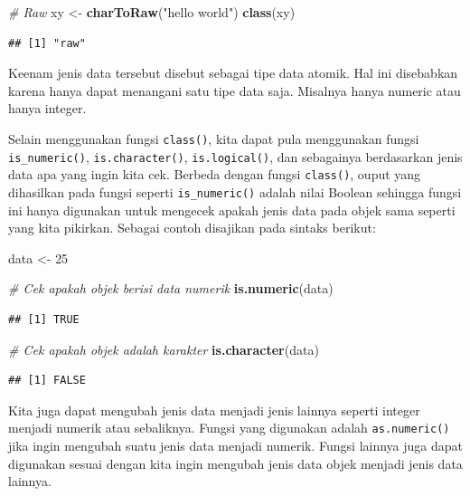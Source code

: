 \documentclass[]{book}
\newenvironment{Shaded}{\begin{snugshade}}{\end{snugshade}}
\newcommand{\CommentTok}[1]{\textcolor[rgb]{0.56,0.35,0.01}{\textit{#1}}}
\newcommand{\DecValTok}[1]{\textcolor[rgb]{0.00,0.00,0.81}{#1}}
\newcommand{\KeywordTok}[1]{\textcolor[rgb]{0.13,0.29,0.53}{\textbf{#1}}}
\newcommand{\NormalTok}[1]{#1}
\newcommand{\StringTok}[1]{\textcolor[rgb]{0.31,0.60,0.02}{#1}}
\theoremstyle{definition}
\theoremstyle{definition}
\theoremstyle{definition}
\theoremstyle{remark}
\begin{document}
\begin{Shaded}
\begin{Highlighting}[]
\CommentTok{# Raw}
\NormalTok{xy <-}\StringTok{ }\KeywordTok{charToRaw}\NormalTok{(}\StringTok{"hello world"}\NormalTok{)}
\KeywordTok{class}\NormalTok{(xy)}
\end{Highlighting}
\end{Shaded}

\begin{verbatim}
## [1] "raw"
\end{verbatim}

Keenam jenis data tersebut disebut sebagai tipe data atomik. Hal ini disebabkan karena hanya dapat menangani satu tipe data saja. Misalnya hanya numeric atau hanya integer.

Selain menggunakan fungsi \texttt{class()}, kita dapat pula menggunakan fungsi \texttt{is\_numeric()}, \texttt{is.character()}, \texttt{is.logical()}, dan sebagainya berdasarkan jenis data apa yang ingin kita cek. Berbeda dengan fungsi \texttt{class()}, ouput yang dihasilkan pada fungsi seperti \texttt{is\_numeric()} adalah nilai Boolean sehingga fungsi ini hanya digunakan untuk mengecek apakah jenis data pada objek sama seperti yang kita pikirkan. Sebagai contoh disajikan pada sintaks berikut:

\begin{Shaded}
\begin{Highlighting}[]
\NormalTok{data <-}\StringTok{ }\DecValTok{25}

\CommentTok{# Cek apakah objek berisi data numerik}
\KeywordTok{is.numeric}\NormalTok{(data)}
\end{Highlighting}
\end{Shaded}

\begin{verbatim}
## [1] TRUE
\end{verbatim}

\begin{Shaded}
\begin{Highlighting}[]
\CommentTok{# Cek apakah objek adalah karakter}
\KeywordTok{is.character}\NormalTok{(data)}
\end{Highlighting}
\end{Shaded}

\begin{verbatim}
## [1] FALSE
\end{verbatim}

Kita juga dapat mengubah jenis data menjadi jenis lainnya seperti integer menjadi numerik atau sebaliknya. Fungsi yang digunakan adalah \texttt{as.numeric()} jika ingin mengubah suatu jenis data menjadi numerik. Fungsi lainnya juga dapat digunakan sesuai dengan kita ingin mengubah jenis data objek menjadi jenis data lainnya.
\end{document}
